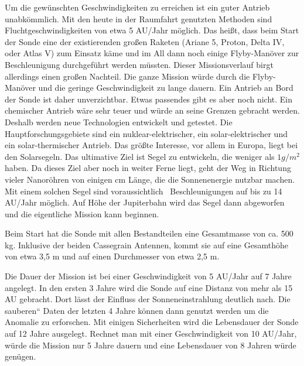 \bigskip

Um die gew\"unschten Geschwindigkeiten zu erreichen ist ein guter
Antrieb unabk\"ommlich. Mit den heute in der Raumfahrt genutzten
Methoden sind Fluchtgeschwindigkeiten von etwa 5 AU/Jahr m\"oglich. Das
hei{\ss}t, dass beim Start der Sonde eine der existierenden gro{\ss}en
Raketen (Ariane 5, Proton, Delta IV, oder Atlas V) zum Einsatz k\"ame
und im All dann noch einige Flyby-Man\"over zur Beschleunigung
durchgef\"uhrt werden m\"ussten. Die\-ser Missionsverlauf birgt
allerdings einen gro{\ss}en Nachteil. Die ganze Mission w\"urde durch
die Flyby-Man\"over und die geringe Geschwindigkeit zu lange dauern.
Ein Antrieb an Bord der Sonde ist daher unverzichtbar. Etwas passendes
gibt es aber noch nicht. Ein chemischer Antrieb w\"are sehr teuer und
w\"urde an seine Grenzen gebracht werden. Des\-halb werden neue
Technologien entwickelt und getestet. Die Hauptforschungsgebiete sind
ein nuklear-elektrischer, ein solar-elektrischer und ein
solar-thermischer Antrieb. Das gr\"o{\ss}te Interesse, vor allem in
Europa, liegt bei den Solarsegeln. Das ultimative Ziel ist Se\-gel zu
entwickeln, die weniger als  $1g/m^{2}$ haben. Da dieses Ziel aber noch
in weiter Fer\-ne liegt, geht der Weg in Richtung vieler Nanor\"ohren
von einigen cm L\"ange, die die Son\-nenenergie nutzbar machen. Mit
einem solchen Segel sind voraussichtlich \ Beschleunigun\-gen auf bis
zu 14 AU/Jahr m\"oglich. Auf H\"ohe der Jupiterbahn wird das Segel dann
abge\-worfen und die eigentliche Mission kann beginnen.


\bigskip

Beim Start hat die Sonde mit allen Bestandteilen eine Gesamtmasse von
ca. 500 kg. Inklu\-sive der beiden Cassegrain Antennen, kommt sie auf
eine Gesamth\"ohe von etwa 3,5 m und auf einen Durchmesser von etwa 2,5
m.


\bigskip

Die Dauer der Mission ist bei einer Geschwindigkeit von 5 AU/Jahr auf 7
Jahre angelegt. In den ersten 3 Jahre wird die Sonde auf eine Distanz
von mehr als 15 AU gebracht. Dort l\"asst der Einfluss der
Sonneneinstrahlung deutlich nach. Die {\quotedblbase}sauberen`` Daten
der letzten 4 Jahre k\"onnen dann genutzt werden um die Anomalie zu
erforschen. Mit einigen Sicher\-heiten wird die Lebensdauer der Sonde
auf 12 Jahre ausgelegt. Rechnet man mit einer Ge\-schwindigkeit von 10
AU/Jahr, w\"urde die Mission nur 5 Jahre dauern und eine Lebens\-dauer
von 8 Jahren w\"urde gen\"ugen.


\bigskip

